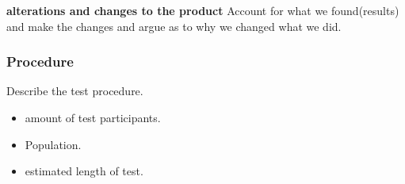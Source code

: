 \textbf{alterations and changes to the product}
Account for what we found(results) and make the changes and argue as to why we changed what we did.

\subsubsection{Procedure}
Describe the test procedure.

\begin{itemize}
\item amount of test participants.
\item Population.
\item estimated length of test.
\end{itemize}


